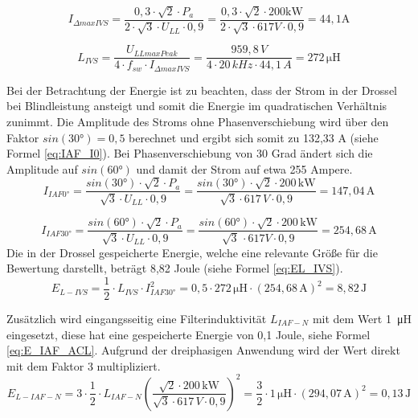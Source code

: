 		\begin{equation}
		\label{eq:DeltaIIVS}
		I_{\Delta max IVS}=\dfrac{0,3\cdot \sqrt{2} \cdot P_{a}}{2 \cdot \sqrt{3} \cdot U_{LL} \cdot 0,9} = \dfrac{0,3\cdot \sqrt{2} \cdot 200 \si{\kilo \watt}}{2 \cdot \sqrt{3} \cdot 617 \si{V} \cdot 0,9} = 44,1 \si{\A}
		\end{equation}
		
		\begin{equation}
			\label{eq:Livs}
			L_{IVS}= \dfrac{U_{LLmaxPeak}}{4\cdot f_{sw} \cdot I_{\Delta max IVS}} = \dfrac{959,8\, V}{4 \cdot 20\, kHz \cdot 44,1\, A}= 272\, \si{\micro \henry}
		\end{equation}
		
		Bei der Betrachtung der Energie ist zu beachten, dass der Strom in der Drossel bei Blindleistung ansteigt und somit die Energie im quadratischen Verhältnis zunimmt. Die Amplitude des Stroms ohne Phasenverschiebung wird über den Faktor $sin(30°)=0,5$ berechnet und ergibt sich somit zu 132,33 A (siehe Formel \ref{eq:IAF_I0}). Bei Phasenverschiebung von 30 Grad ändert sich die Amplitude auf $sin(60°)$ und damit der Strom auf etwa 255 Ampere.
		\begin{equation}
			\label{eq:IAF_I0}
			I_{IAF0°}= \dfrac{sin(30°)\cdot \sqrt{2} \cdot P_{a}} { \sqrt{3} \cdot U_{LL} \cdot 0,9}=\dfrac{sin(30°)\cdot \sqrt{2} \cdot 200\, \si{\kilo \watt}} { \sqrt{3} \cdot 617\, \si{V} \cdot 0,9} = 147,04\, \si{\A}
		\end{equation}
		
		\begin{equation}
			\label{eq:IAF_I30}
			I_{IAF30°}=\dfrac{sin(60°)\cdot \sqrt{2} \cdot P_{a}} { \sqrt{3} \cdot U_{LL} \cdot 0,9} =\dfrac{sin(60°) \cdot \sqrt{2} \cdot 200\, \si{\kilo \watt}} { \sqrt{3}\, \cdot 617 \si{V} \cdot 0,9} = 254,68\, \si{\A}
		\end{equation}
		Die in der Drossel gespeicherte Energie, welche eine relevante Größe für die Bewertung darstellt, beträgt 8,82 Joule (siehe Formel \ref{eq:EL_IVS}).
		\begin{equation}
			\label{eq:EL_IVS}
			E_{L-IVS}=\dfrac{1}{2} \cdot L_{IVS} \cdot I_{IAF30°}^{2} = 0,5 \cdot 272\, \si{\micro \henry} \cdot (254,68\, \si{\A})^{2} =  8,82 \, \si{\joule}
		\end{equation}
		
		
		Zusätzlich wird eingangsseitig eine Filterinduktivität $L_{IAF-N}$ mit dem Wert 1~\si{\micro \henry} eingesetzt, diese hat eine gespeicherte Energie von 0,1 Joule, siehe Formel \ref{eq:E_IAF_ACL}. Aufgrund der dreiphasigen Anwendung wird der Wert direkt mit dem Faktor 3 multipliziert.
			\begin{equation}
			\label{eq:E_IAF_ACL}
			E_{L-IAF-N}= 3\cdot \dfrac{1}{2} \cdot L_{IAF-N} (\dfrac{  \sqrt{2} \cdot 200\, \si{\kilo \watt}} { \sqrt{3} \cdot 617\, \si{V} \cdot 0,9} )^2=\dfrac{3}{2} \cdot 1\, \si{\micro \henry} \cdot (294,07 \, \si{\ampere})^{2} = 0,13 \, \si{\joule}
		\end{equation}
	
